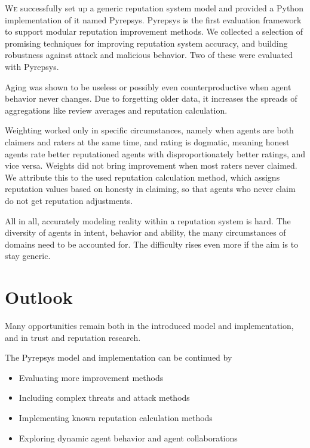 \documentclass[%
    ]{\PathToTumTemplate/thesis/tum_thesis}
\begin{document}
 
\lettrine{W}{e} successfully set up a generic reputation system model and provided a Python implementation of it named Pyrepsys.
Pyrepsys is the first evaluation framework to support modular reputation improvement methods.
We collected a selection of promising techniques for improving reputation system accuracy, and building robustness against attack and malicious behavior.
Two of these were evaluated with Pyrepsys.

Aging was shown to be useless or possibly even counterproductive when agent behavior never changes.
Due to forgetting older data, it increases the spreads of aggregations like review averages and reputation calculation.

Weighting worked only in specific circumstances, namely when agents are both claimers and raters at the same time, and rating is dogmatic, meaning honest agents rate better reputationed agents with disproportionately better ratings, and vice versa.
Weights did not bring improvement when most raters never claimed.
We attribute this to the used reputation calculation method, which assigns reputation values based on honesty in claiming, so that agents who never claim do not get reputation adjustments.

All in all, accurately modeling reality within a reputation system is hard.
The diversity of agents in intent, behavior and ability, the many circumstances of domains need to be accounted for.
The difficulty rises even more if the aim is to stay generic.



\section{Outlook}\label{sec:outlook}

Many opportunities remain both in the introduced model and implementation, and in trust and reputation research.

The Pyrepsys model and implementation can be continued by
\begin{itemize}
	\item Evaluating more improvement methods
	\item Including complex threats and attack methods
	\item Implementing known reputation calculation methods
	\item Exploring dynamic agent behavior and agent collaborations
\end{itemize}
\end{document}
